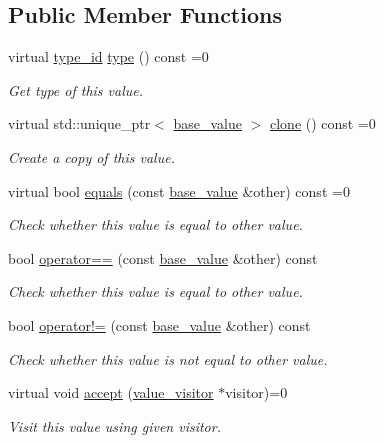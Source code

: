 \subsection*{Public Member Functions}
\begin{DoxyCompactItemize}
\item 
virtual \mbox{\hyperlink{value_8hpp_ab9af7d8ecc381e026ca4d07a745f23eb}{type\+\_\+id}} \mbox{\hyperlink{classdice_1_1base__value_a5125d076b0ed6a398f4f4f8fe19ef60b}{type}} () const =0
\begin{DoxyCompactList}\small\item\em Get type of this value. \end{DoxyCompactList}\item 
virtual std\+::unique\+\_\+ptr$<$ \mbox{\hyperlink{classdice_1_1base__value}{base\+\_\+value}} $>$ \mbox{\hyperlink{classdice_1_1base__value_a58335a522dda6d97332f938ead90aa15}{clone}} () const =0
\begin{DoxyCompactList}\small\item\em Create a copy of this value. \end{DoxyCompactList}\item 
virtual bool \mbox{\hyperlink{classdice_1_1base__value_a81269be4c101eeef6d48810823e1835c}{equals}} (const \mbox{\hyperlink{classdice_1_1base__value}{base\+\_\+value}} \&other) const =0
\begin{DoxyCompactList}\small\item\em Check whether this value is equal to other value. \end{DoxyCompactList}\item 
bool \mbox{\hyperlink{classdice_1_1base__value_a5939b300dd577d307cf94d3a6d726210}{operator==}} (const \mbox{\hyperlink{classdice_1_1base__value}{base\+\_\+value}} \&other) const
\begin{DoxyCompactList}\small\item\em Check whether this value is equal to other value. \end{DoxyCompactList}\item 
bool \mbox{\hyperlink{classdice_1_1base__value_a6a05109afbb4b9a2c77887d76e7edbab}{operator!=}} (const \mbox{\hyperlink{classdice_1_1base__value}{base\+\_\+value}} \&other) const
\begin{DoxyCompactList}\small\item\em Check whether this value is not equal to other value. \end{DoxyCompactList}\item 
virtual void \mbox{\hyperlink{classdice_1_1base__value_a8ab0acd9a7b10035a1c8f8a0f05b40b4}{accept}} (\mbox{\hyperlink{classdice_1_1value__visitor}{value\+\_\+visitor}} $\ast$visitor)=0
\begin{DoxyCompactList}\small\item\em Visit this value using given visitor. \end{DoxyCompactList}\end{DoxyCompactItemize}


